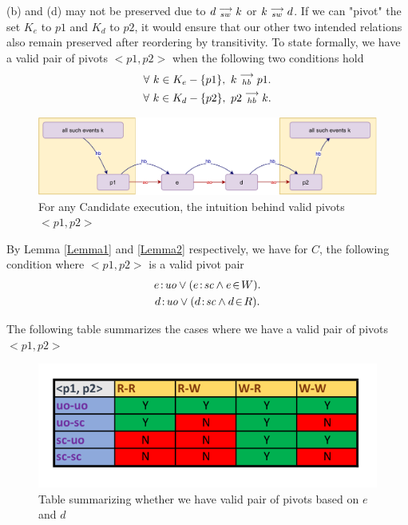    (b) and (d) may not be preserved due to $d\stackrel{\longrightarrow}{_{sw}}k$ or $k\stackrel{\longrightarrow}{_{sw}}d$. If we can "pivot" the  set $K_e$ to $p1$ and $K_d$ to $p2$, it would ensure that our other two intended relations also remain preserved after reordering by transitivity. To state formally, we have a valid pair of pivots $<p1,p2>$ when the following two conditions hold
    \begin{gather*}
        \forall \ k \in K_e - \{p1\}, \ k\stackrel{\longrightarrow}{_{hb}}p1. \\
        \forall \ k \in K_d - \{p2\}, \ p2\stackrel{\longrightarrow}{_{hb}}k.
    \end{gather*}
    
    \begin{figure}[H]
        \centering
        \includegraphics[scale=0.7]{5.InstructionReordering/4.ValidReorderingCandidate/ProofParts/Part1/part1(d).pdf}
        \caption{For any Candidate execution, the intuition behind valid pivots $<p1,p2>$}
        \label{fig:my_label}
    \end{figure}
    
    By Lemma \ref{Lemma1} and \ref{Lemma2} respectively, we have for $C$, the following condition where $<p1, p2>$ is a valid pivot pair
    \begin{gather*}
        \et{e}{uo} \vee (\et{e}{sc} \wedge \event{e}{W}). \\
        \et{d}{uo} \vee (\et{d}{sc} \wedge \event{d}{R}).
    \end{gather*}
        
    The following table summarizes the cases where we have a valid pair of pivots\footnotemark $<p1,p2>$
    \begin{figure}[H]
        \centering
        \includegraphics[scale=0.7]{5.InstructionReordering/4.ValidReorderingCandidate/ProofParts/Part1/part1_table.pdf}
        \caption{Table summarizing whether we have valid pair of pivots based on  $e$ and $d$}
        \label{fig:my_label}
    \end{figure}
            
